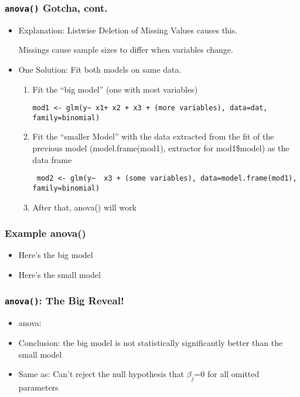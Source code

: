 \documentclass[10pt,english]{beamer}
\begin{document}
\begin{frame}[containsverbatim]
  \frametitle{\texttt{anova()} Gotcha, cont.}
  \begin{itemize}
    \item Explanation: Listwise Deletion of Missing Values causes this.

      Missings cause sample sizes to differ when variables change.

    \item One Solution: Fit both models on same data.
    \begin{enumerate}
      \item Fit the ``big model'' (one with most variables)

\begin{lstlisting}
mod1 <- glm(y~ x1+ x2 + x3 + (more variables), data=dat, family=binomial)
\end{lstlisting}


      \item Fit the ``smaller Model'' with the data extracted from
        the fit of the previous model (model.frame(mod1), extractor for mod1\$model) as the data frame

\begin{lstlisting}
 mod2 <- glm(y~  x3 + (some variables), data=model.frame(mod1), family=binomial)\end{lstlisting}

   \item After that, anova() will work

     \end{enumerate}
   \end{itemize}
\end{frame}

\begin{frame}[containsverbatim]
  \frametitle{Example anova()}
  \begin{itemize}


  \item Here's the big model


 \item Here's the small model


 \end{itemize}
 \end{frame}




\begin{frame}[containsverbatim]
  \frametitle{\texttt{anova()}: The Big Reveal!}
  \begin{itemize}

  \item anova:


  \item Conclusion: the big model is not statistically significantly
    better than the small model
  \item Same as: Can't reject the null hypothesis that $\beta_j$=0 for
    all omitted parameters
 \end{itemize}
\end{frame}
\end{document}
